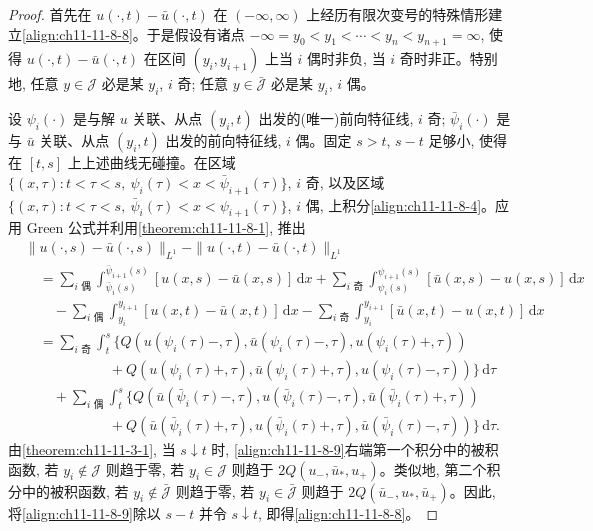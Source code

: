 \documentclass[../../main.tex]{subfiles}
\begin{document}
\begin{proof}
首先在 $u(\cdot,t)-\bar u(\cdot,t)$ 在 $(-\infty,\infty)$ 上经历有限次变号的特殊情形建立\eqref{align:ch11-11-8-8}。于是假设有诸点 $-\infty=y_0<y_1<\cdots<y_n<y_{n+1}=\infty$, 使得 $u(\cdot,t)-\bar u(\cdot,t)$ 在区间 $(y_i,y_{i+1})$ 上当 $i$ 偶时非负, 当 $i$ 奇时非正。特别地, 任意 $y\in\mathscr{J}$ 必是某 $y_i$, $i$ 奇; 任意 $y\in\bar{\mathscr{J}}$ 必是某 $y_i$, $i$ 偶。

设 $\psi_i(\cdot)$ 是与解 $u$ 关联、从点 $(y_i,t)$ 出发的(唯一)前向特征线, $i$ 奇; $\bar\psi_i(\cdot)$ 是与 $\bar u$ 关联、从点 $(y_i,t)$ 出发的前向特征线, $i$ 偶。固定 $s>t$, $s-t$ 足够小, 使得在 $[t,s]$ 上上述曲线无碰撞。在区域 $\{(x,\tau):t<\tau<s,\ \psi_i(\tau)<x<\bar\psi_{i+1}(\tau)\}$, $i$ 奇, 以及区域 $\{(x,\tau):t<\tau<s,\ \bar\psi_i(\tau)<x<\psi_{i+1}(\tau)\}$, $i$ 偶, 上积分\eqref{align:ch11-11-8-4}。应用 Green 公式并利用\cref{theorem:ch11-11-8-1}, 推出
\begin{align}
&\|u(\cdot,s)-\bar u(\cdot,s)\|_{L^1}-\|u(\cdot,t)-\bar u(\cdot,t)\|_{L^1}\nonumber\\
&\quad=\sum_{i\text{ 偶}}\int_{\bar\psi_i(s)}^{\bar\psi_{i+1}(s)}[u(x,s)-\bar u(x,s)]\,\mathrm{d}x
+\sum_{i\text{ 奇}}\int_{\psi_i(s)}^{\psi_{i+1}(s)}[\bar u(x,s)-u(x,s)]\,\mathrm{d}x\nonumber\\
&\qquad-\sum_{i\text{ 偶}}\int_{y_i}^{y_{i+1}}[u(x,t)-\bar u(x,t)]\,\mathrm{d}x
-\sum_{i\text{ 奇}}\int_{y_i}^{y_{i+1}}[\bar u(x,t)-u(x,t)]\,\mathrm{d}x\nonumber\\
&\quad=\sum_{i\text{ 奇}}\int_t^s\{Q(u(\psi_i(\tau)-,\tau),\bar u(\psi_i(\tau)-,\tau),u(\psi_i(\tau)+,\tau))\nonumber\\
&\qquad\qquad\qquad+Q(u(\psi_i(\tau)+,\tau),\bar u(\psi_i(\tau)+,\tau),u(\psi_i(\tau)-,\tau))\}\,\mathrm{d}\tau\nonumber\\
&\qquad+\sum_{i\text{ 偶}}\int_t^s\{Q(\bar u(\bar\psi_i(\tau)-,\tau),u(\bar\psi_i(\tau)-,\tau),\bar u(\bar\psi_i(\tau)+,\tau))\nonumber\\
&\qquad\qquad\qquad+Q(\bar u(\bar\psi_i(\tau)+,\tau),u(\bar\psi_i(\tau)+,\tau),\bar u(\bar\psi_i(\tau)-,\tau))\}\,\mathrm{d}\tau.\label{align:ch11-11-8-9}
\end{align}
由\cref{theorem:ch11-11-3-1}, 当 $s\downarrow t$ 时, \eqref{align:ch11-11-8-9}右端第一个积分中的被积函数, 若 $y_i\notin\mathscr{J}$ 则趋于零, 若 $y_i\in\mathscr{J}$ 则趋于 $2Q(u_-,\bar u_*,u_+)$。类似地, 第二个积分中的被积函数, 若 $y_i\notin\bar{\mathscr{J}}$ 则趋于零, 若 $y_i\in\bar{\mathscr{J}}$ 则趋于 $2Q(\bar u_-,u_*,\bar u_+)$。因此, 将\eqref{align:ch11-11-8-9}除以 $s-t$ 并令 $s\downarrow t$, 即得\eqref{align:ch11-11-8-8}。


\end{proof}
\end{document}

